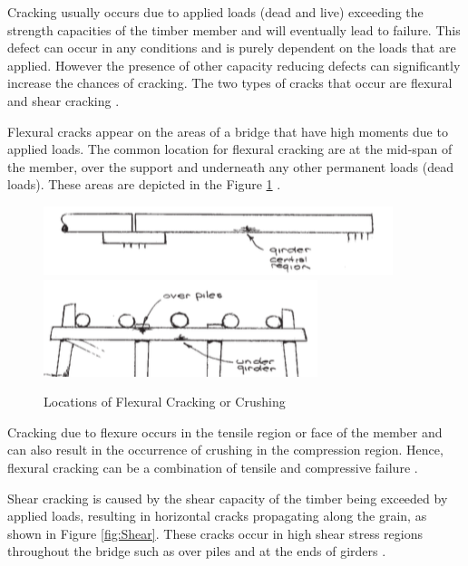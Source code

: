 \documentclass[11pt,a4paper]{article}
\numberwithin{equation}{subsection}
\begin{document}
    \noindent
    Cracking usually occurs due to applied loads (dead and live) exceeding the strength capacities of the timber member and will eventually lead to failure. This defect can occur in any conditions and is purely dependent on the loads that are applied. However the presence of other capacity reducing defects can significantly increase the chances of cracking. The two types of cracks that occur are flexural and shear cracking \cite{_timber_2005}.
	
    \vspace*{\baselineskip}	
	
	\noindent
	Flexural cracks appear on the areas of a bridge that have high moments due to applied loads. The common location for flexural cracking are at the mid-span of the member, over the support and underneath any other permanent loads (dead loads). These areas are depicted in the Figure \ref{fig:Flex} \cite{_timber_2005}.  

 	\begin{figure}[h]
        \begin{center}
		 	\includegraphics[scale=0.8]{Failure_Location_1}
	 		\includegraphics[scale=0.8]{Failure_Location_2}
        \end{center}
	 		\caption{Locations of Flexural Cracking or Crushing \cite{_timber_2005}}
	 		\label{fig:Flex}
	\end{figure}
\pagebreak

    \noindent
	Cracking due to flexure occurs in the tensile region or face of the member and can also result in the occurrence of crushing in the compression region. Hence, flexural cracking can be a combination of tensile and compressive failure \cite{thelandersson_timber_2003}. 

    \vspace*{\baselineskip}	
    
	\noindent
	Shear cracking is caused by the shear capacity of the timber being exceeded by applied loads, resulting in horizontal cracks propagating along the grain, as shown in Figure \ref{fig:Shear}. These cracks occur in high shear stress regions throughout the bridge such as over piles and at the ends of girders \cite{_timber_2005}. 
	
\end{document}
